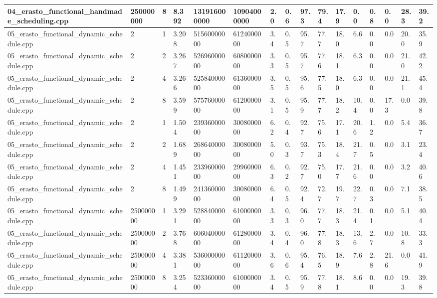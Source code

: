 \documentclass[12pt]{article}
\begin{document}
\begin{flushleft}
\begin{tabular}{| l | l | l | l | l | l | l | l | l | l | l | l | l | l | l | l |}
		04\_erasto\_functional\_handmade\_scheduling.cpp & 250000000 & 8 & 8.392 & 131916000000 & 10904000000 & 2.0 & 0.6 & 97.3 & 79.4 & 17.9 & 0.0 & 0.8 & 0.0 & 28.3 & 39.2 \\ \hline
		05\_erasto\_functional\_dynamic\_schedule.cpp & 2 & 1 & 3.208 & 51560000000 & 6124000000 & 3.4 & 0.5 & 95.7 & 77.7 & 18.0 & 6.6 & 0.0 & 0.0 & 20.0 & 35.9 \\ \hline
		05\_erasto\_functional\_dynamic\_schedule.cpp & 2 & 2 & 3.267 & 52696000000 & 6080000000 & 3.3 & 0.5 & 95.7 & 77.6 & 18.1 & 6.3 & 0.0 & 0.0 & 21.0 & 42.2 \\ \hline
		05\_erasto\_functional\_dynamic\_schedule.cpp & 2 & 4 & 3.266 & 52584000000 & 6136000000 & 3.5 & 0.5 & 95.6 & 77.5 & 18.0 & 6.3 & 0.0 & 0.0 & 21.1 & 45.4 \\ \hline
		05\_erasto\_functional\_dynamic\_schedule.cpp & 2 & 8 & 3.599 & 57576000000 & 6120000000 & 3.1 & 0.5 & 95.9 & 77.7 & 18.2 & 10.4 & 0.0 & 17.3 & 0.0 & 39.8 \\ \hline
		05\_erasto\_functional\_dynamic\_schedule.cpp & 2 & 1 & 1.504 & 23936000000 & 3008000000 & 6.2 & 0.4 & 92.7 & 75.6 & 17.1 & 20.6 & 1.2 & 0.0 & 5.4 & 36.7 \\ \hline
		05\_erasto\_functional\_dynamic\_schedule.cpp & 2 & 2 & 1.689 & 26864000000 & 3008000000 & 5.0 & 0.3 & 93.7 & 75.3 & 18.4 & 21.7 & 0.5 & 0.0 & 3.1 & 23.4 \\ \hline
		05\_erasto\_functional\_dynamic\_schedule.cpp & 2 & 4 & 1.451 & 23396000000 & 2996000000 & 6.3 & 0.2 & 92.7 & 75.0 & 17.7 & 21.6 & 0.0 & 0.0 & 3.2 & 40.6 \\ \hline
		05\_erasto\_functional\_dynamic\_schedule.cpp & 2 & 8 & 1.499 & 24136000000 & 3008000000 & 6.4 & 0.5 & 92.4 & 72.7 & 19.7 & 22.7 & 0.3 & 0.0 & 7.1 & 38.5 \\ \hline
		05\_erasto\_functional\_dynamic\_schedule.cpp & 250000000 & 1 & 3.291 & 52884000000 & 6100000000 & 3.3 & 0.3 & 96.0 & 77.7 & 18.3 & 21.4 & 0.1 & 0.0 & 5.1 & 40.4 \\ \hline
		05\_erasto\_functional\_dynamic\_schedule.cpp & 250000000 & 2 & 3.768 & 60604000000 & 6128000000 & 3.4 & 0.4 & 96.0 & 77.8 & 18.3 & 13.6 & 2.7 & 0.0 & 10.8 & 33.3 \\ \hline
		05\_erasto\_functional\_dynamic\_schedule.cpp & 250000000 & 4 & 3.381 & 53600000000 & 6112000000 & 3.6 & 0.6 & 95.4 & 76.5 & 18.9 & 7.6 & 2.8 & 21.6 & 0.0 & 41.9 \\ \hline
		05\_erasto\_functional\_dynamic\_schedule.cpp & 250000000 & 8 & 3.254 & 52336000000 & 6100000000 & 3.4 & 0.5 & 95.9 & 77.8 & 18.1 & 8.6 & 0.0 & 0.0 & 19.3 & 39.8 \\ \hline

\end{tabular}
\end{flushleft}
\end{document}
